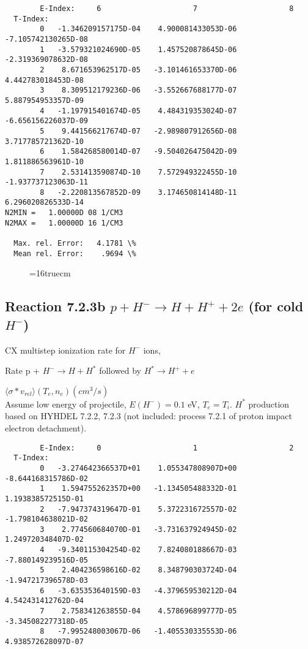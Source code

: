 \documentclass[12pt,dvipdfmx]{article}
\begin{document}
{\begin{small}
\begin{verbatim}
        E-Index:     6                     7                     8
  T-Index:
        0   -1.346209157175D-04    4.900081433053D-06   -7.105742130265D-08
        1   -3.579321024690D-05    1.457520878645D-06   -2.319369078632D-08
        2    8.671653962517D-05   -3.101461653370D-06    4.442783018453D-08
        3    8.309512179236D-06   -3.552667688177D-07    5.887954953357D-09
        4   -1.197915401674D-05    4.484319353024D-07   -6.656156226037D-09
        5    9.441566217674D-07   -2.989807912656D-08    3.717785721362D-10
        6    1.584268580014D-07   -9.504026475042D-09    1.811886563961D-10
        7    2.531413590874D-10    7.572949322455D-10   -1.937737123063D-11
        8   -2.220813567852D-09    3.174650814148D-11    6.296020826533D-14
N2MIN =   1.00000D 08 1/CM3
N2MAX =   1.00000D 16 1/CM3

  Max. rel. Error:   4.1781 \%
  Mean rel. Error:    .9694 \%
\end{verbatim}\end{small}
\begin{figure} \label{7.2.3a}
\epsfxsize=16truecm
\end{figure}
\newpage

\subsection{
Reaction 7.2.3b   $ p + H^{-} \rightarrow  H + H^+ + 2e$ (for cold $H^-$)
}

  CX multistep ionization rate for $H^-$ ions,
 \cite{kn:Sawada}

  Rate p + $H^- \rightarrow H + H^*$ followed by $H^* \rightarrow H^+
+e$

$  \langle \sigma*v_{rel} \rangle(T_e,n_e) (cm^3/s)$ \\
Assume low energy of projectile, $E(H^-)=0.1$ eV, $T_e = T_i$.
$H^*$ production based on HYHDEL 7.2.2, 7.2.3 (not included: process 7.2.1 of proton impact electron detachment).

\begin{small}\begin{verbatim}
        E-Index:     0                     1                     2
  T-Index:
        0   -3.274642366537D+01    1.055347808907D+00   -8.644168315786D-02
        1    1.594755262357D+00   -1.134505488332D-01    1.193838572515D-01
        2   -7.947374319647D-01    5.372231672557D-02   -1.798104638021D-02
        3    2.774560684070D-01   -3.731637924945D-02    1.249720348407D-02
        4   -9.340115304254D-02    7.824080188667D-03   -7.880149239516D-05
        5    2.404236598616D-02    8.348790303724D-04   -1.947217396578D-03
        6   -3.635353640159D-03   -4.379659530212D-04    4.542431412762D-04
        7    2.758341263855D-04    4.578696899777D-05   -3.345082277318D-05
        8   -7.995248003067D-06   -1.405530335553D-06    4.938572628097D-07


\end{verbatim}
\end{small}}
\end{document}
